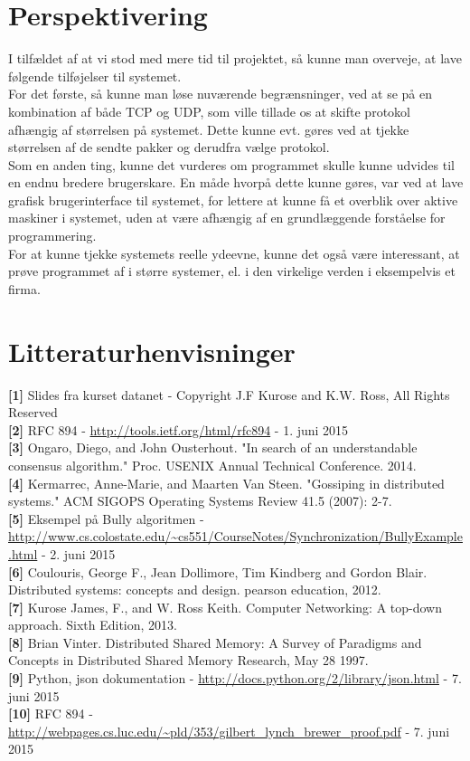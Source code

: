 \documentclass[a4paper,12pt]{article}
\begin{document}
\section{Perspektivering}
I tilfældet af at vi stod med mere tid til projektet, så kunne man overveje, at lave følgende tilføjelser til systemet.
\\
For det første, så kunne man løse nuværende begrænsninger, ved at se på en kombination af både TCP og UDP, som ville tillade os at skifte protokol afhængig af størrelsen på systemet. Dette kunne evt. gøres ved at tjekke størrelsen af de sendte pakker og derudfra vælge protokol.
\\
Som en anden ting, kunne det vurderes om programmet skulle kunne udvides til en endnu bredere brugerskare. En måde hvorpå dette kunne gøres, var ved at lave grafisk brugerinterface til systemet, for lettere at kunne få et overblik over aktive maskiner i systemet, uden at være afhængig af en grundlæggende forståelse for programmering.
\\
For at kunne tjekke systemets reelle ydeevne, kunne det også være interessant, at prøve programmet af i større systemer, el. i den virkelige verden i eksempelvis et firma.
\newpage

\section{Litteraturhenvisninger}
\textbf{[1]} Slides fra kurset datanet - Copyright J.F Kurose and K.W. Ross, All Rights Reserved \label{et}
\\[5px]
\textbf{[2]} RFC 894 - \url{http://tools.ietf.org/html/rfc894} - 1. juni 2015 \label{to}
\\[5px]
\textbf{[3]} Ongaro, Diego, and John Ousterhout. "In search of an understandable consensus algorithm." Proc. USENIX Annual Technical Conference. 2014. \label{tre}
\\[5px]
\textbf{[4]} Kermarrec, Anne-Marie, and Maarten Van Steen. "Gossiping in distributed systems." ACM SIGOPS Operating Systems Review 41.5 (2007): 2-7. \label{fire}
\\[5px]
\textbf{[5]} Eksempel på Bully algoritmen - \url{http://www.cs.colostate.edu/~cs551/CourseNotes/Synchronization/BullyExample.html} - 2. juni 2015 \label{fem}
\\[5px]
\textbf{[6]} Coulouris, George F., Jean Dollimore, Tim Kindberg and Gordon Blair. Distributed systems: concepts and design. pearson education, 2012. \label{seks}
\\[5px]
\textbf{[7]} Kurose James, F., and W. Ross Keith. Computer Networking: A top-down approach. Sixth Edition, 2013. \label{syv}
\\[5px]
\textbf{[8]} Brian Vinter. Distributed Shared Memory: A Survey of Paradigms and Concepts in Distributed Shared Memory Research, May 28 1997. \label{otte}
\\[5px]
\textbf{[9]} Python, json dokumentation - \url{http://docs.python.org/2/library/json.html} - 7. juni 2015 \label{ni}
\\[5px]
\textbf{[10]} RFC 894 - \url{http://webpages.cs.luc.edu/~pld/353/gilbert_lynch_brewer_proof.pdf} - 7. juni 2015 \label{ti}
\end{document}
